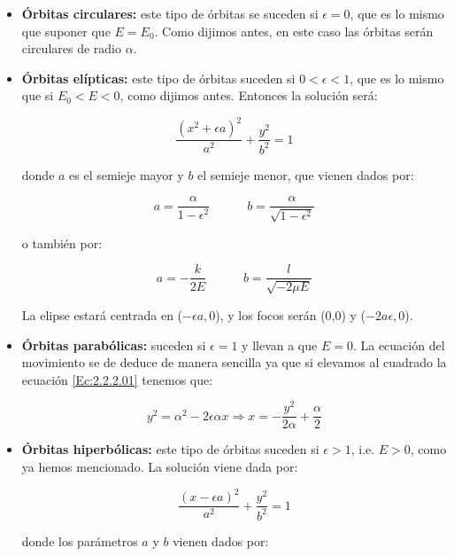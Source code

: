 \documentclass[12pt,a4paper]{book}
\begin{document}
\begin{itemize}
\item \textbf{Órbitas circulares:} este tipo de órbitas se suceden si $\epsilon=0$, que es lo mismo que suponer que $E=E_0$. Como dijimos antes, en este caso las órbitas serán circulares de radio $\alpha$. 

\item \textbf{Órbitas elípticas:} este tipo de órbitas suceden si $0<\epsilon<1$, que es lo mismo que si $E_0 < E < 0$, como dijimos antes. Entonces la solución será:

\begin{equation}
\dfrac{(x^2 + \epsilon a)^2}{a^2} + \dfrac{y^2}{b^2} = 1
\end{equation}

donde $a$ es el semieje mayor y $b$ el semieje menor, que vienen dados por:

\begin{equation}
a = \dfrac{\alpha}{1-\epsilon^2} \quad \quad \quad b = \dfrac{\alpha}{\sqrt{1-\epsilon^2}}
\end{equation}

o también por:

\begin{equation}
a = - \dfrac{k}{2E} \quad \quad \quad b = \dfrac{l}{\sqrt{-2 \mu E}}
\end{equation}

La elipse estará centrada en ($ -\epsilon a, 0 $), y los focos serán (0,0) y ($-2a\epsilon,0$).

\item \textbf{Órbitas parabólicas:} suceden si $\epsilon = 1$ y llevan a que $E=0$. La ecuación del movimiento se de deduce de manera sencilla ya que si elevamos al cuadrado la ecuación \ref{Ec:2.2.2.01} tenemos que:

\begin{equation}
y^2 = \alpha^2 - 2 \epsilon \alpha x \Longrightarrow x = - \dfrac{y^2}{2 \alpha} + \dfrac{\alpha}{2}
\end{equation}

\item \textbf{Órbitas hiperbólicas:} este tipo de órbitas suceden si $\epsilon>1$, i.e. $E>0$, como ya hemos mencionado. La solución viene dada por: 

\begin{equation}
\dfrac{(x-\epsilon a)^2}{a^2} + \frac{y^2}{b^2} = 1
\end{equation}

donde los parámetros $a$ y $b$ vienen dados por:



\end{itemize}
\end{document}
